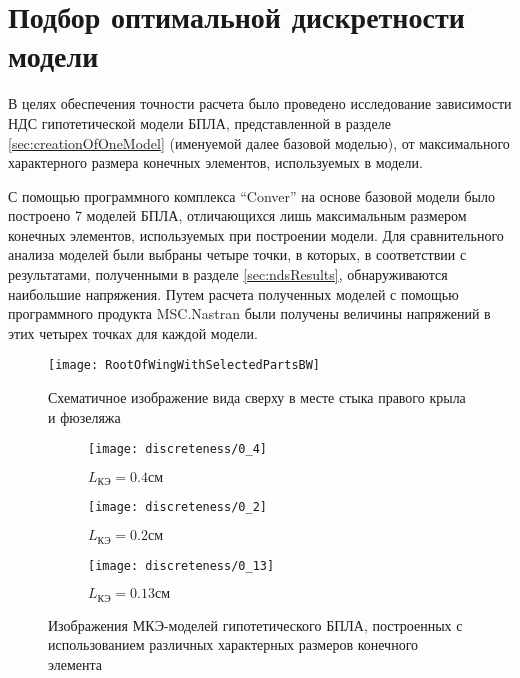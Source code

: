 \section{Подбор оптимальной дискретности модели}
\label{sec:optimalMKESize}

В целях обеспечения точности расчета было проведено исследование зависимости 
НДС гипотетической модели БПЛА, представленной в разделе \ref{sec:creationOfOneModel} (именуемой далее базовой моделью), от максимального характерного размера конечных элементов, используемых в модели. 

С помощью программного комплекса ``Conver'' на основе базовой модели было построено 7 моделей БПЛА, отличающихся лишь максимальным размером конечных элементов, используемых при построении модели. Для сравнительного анализа моделей были выбраны четыре точки, в которых, в соответствии с результатами, полученными в разделе \ref{sec:ndsResults}, обнаруживаются наибольшие напряжения. Путем расчета полученных моделей с помощью программного продукта MSC.Nastran были получены величины напряжений в этих четырех точках для каждой модели.


\begin{figure}[ht]
\centering
\texttt{[image: RootOfWingWithSelectedPartsBW]}
\caption{Схематичное изображение вида сверху в месте стыка правого крыла и фюзеляжа}
\label{fig:WingRootPlain}
\end{figure}


\begin{figure}[H]
\captionsetup{justification=centering}
\centering
	\begin{subfigure}[b]{0.8\textwidth}
	\texttt{[image: discreteness/0\_4]}
	\caption{$L_\text{КЭ} = 0.4см$}
	\label{fig:discr:0_4}
	\end{subfigure}
	\begin{subfigure}[b]{0.8\textwidth}
	\texttt{[image: discreteness/0\_2]}
	\caption{$L_\text{КЭ} = 0.2см$}
	\label{fig:discr:0_2}
	\end{subfigure}
	\begin{subfigure}[b]{0.8\textwidth}
	\texttt{[image: discreteness/0\_13]}
	\caption{$L_\text{КЭ} = 0.13см$}
	\label{fig:discr:0_13}
	\end{subfigure}
\label{fig:discreteness}
\caption{Изображения МКЭ-моделей гипотетического БПЛА, построенных с использованием различных характерных размеров конечного элемента}
\end{figure}



